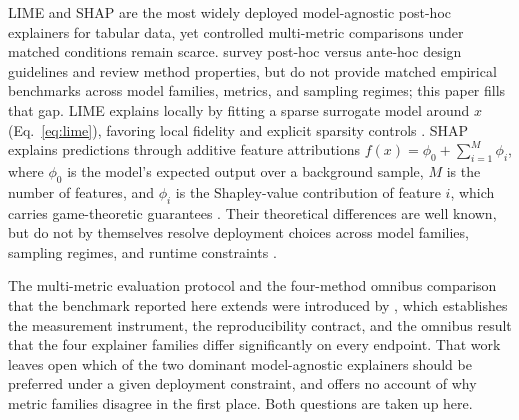 \documentclass[fleqn,10pt,lineno]{wlpeerj}
\begin{document}
LIME and SHAP are the most widely deployed model-agnostic post-hoc
explainers for tabular data, yet controlled multi-metric comparisons
under matched conditions remain scarce. \citet{retzlaff2024posthoc} survey post-hoc versus ante-hoc design
guidelines and review method properties, but do not provide matched
empirical benchmarks across model families, metrics, and sampling regimes;
this paper fills that gap. LIME explains locally by
fitting a sparse surrogate model around $x$ (Eq.~\ref{eq:lime}),
favoring local fidelity and explicit sparsity controls
\citep{ribeiro2016why}. SHAP explains predictions through additive
feature attributions $f(x) = \phi_0 + \sum_{i=1}^{M} \phi_i$, where
$\phi_0$ is the model's expected output over a background sample, $M$
is the number of features, and $\phi_i$ is the Shapley-value contribution
of feature $i$, which carries game-theoretic guarantees
\citep{lundberg2017unified}. Their theoretical differences are well
known, but do not by themselves resolve deployment choices across model
families, sampling regimes, and runtime constraints
\citep{retzlaff2024posthoc,ali2023trustworthy}.

The multi-metric evaluation protocol and the four-method omnibus comparison
that the benchmark reported here extends were introduced by
\citet{herrera2026framework}, which establishes the measurement instrument,
the reproducibility contract, and the omnibus result that the four
explainer families differ significantly on every endpoint. That work leaves
open which of the two dominant model-agnostic explainers should be preferred
under a given deployment constraint, and offers no account of why metric
families disagree in the first place. Both questions are taken up here.
\end{document}
